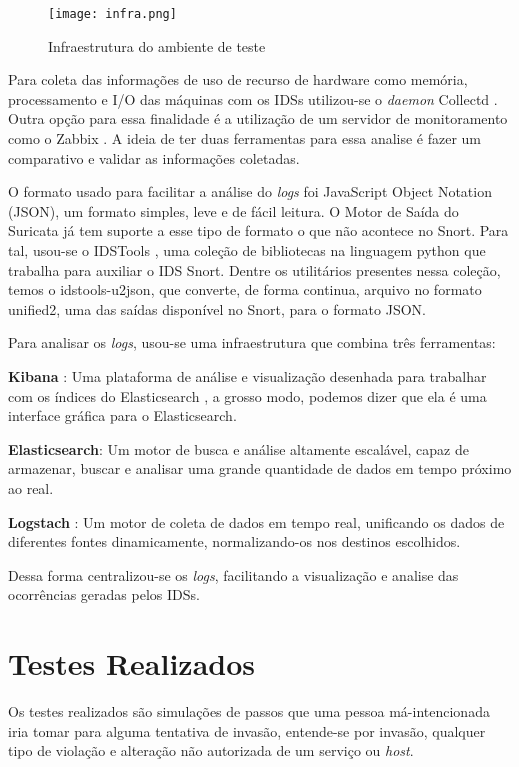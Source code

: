 \begin{figure}[!htb]
\centering
\caption{Infraestrutura do ambiente de teste}
\texttt{[image: infra.png]}
\label{fig:infra-ambiente}
\end{figure}

Para coleta das informações de uso de recurso de hardware como memória, processamento e I/O das máquinas com os IDSs utilizou-se o \textit{daemon} Collectd \cite{collectd}. Outra opção para essa finalidade é a utilização de um servidor de monitoramento como o Zabbix \cite{zabbix}. A ideia de ter duas ferramentas para essa analise é fazer um comparativo e validar as informações coletadas.

O formato usado para facilitar a análise do \textit{logs} foi JavaScript Object Notation (JSON), um formato simples, leve e de fácil leitura. O Motor de Saída do Suricata já tem suporte a esse tipo de formato o que não acontece no Snort. Para tal, usou-se o IDSTools \cite{py-idstools}, uma coleção de bibliotecas na linguagem python que trabalha para auxiliar o IDS Snort. Dentre os utilitários presentes nessa coleção, temos o idstools-u2json, que converte, de forma continua, arquivo no formato unified2, uma das saídas disponível no Snort, para o formato JSON.

Para analisar os \textit{logs}, usou-se uma infraestrutura que combina três ferramentas:

\begin{alineas}
\item \textbf{Kibana} \cite{kibana}: Uma plataforma de análise e visualização desenhada para trabalhar com os índices do Elasticsearch \cite{elasticsearch}, a grosso modo, podemos dizer que ela é uma interface gráfica para o Elasticsearch. 
\item \textbf{Elasticsearch}: Um motor de busca e análise altamente escalável, capaz de armazenar, buscar e analisar uma grande quantidade de dados em tempo próximo ao real. 
\item \textbf{Logstach} \cite{logstach}: Um motor de coleta de dados em tempo real, unificando os dados de diferentes fontes dinamicamente, normalizando-os nos destinos escolhidos.
\end{alineas}

Dessa forma centralizou-se os \textit{logs}, facilitando a visualização e analise das ocorrências geradas pelos IDSs. 

\section{Testes Realizados} \label{sec:testes}
Os testes realizados são simulações de passos que uma pessoa má-intencionada iria tomar para alguma tentativa de invasão, entende-se por invasão, qualquer tipo de violação e alteração não autorizada de um serviço ou \textit{host}.

